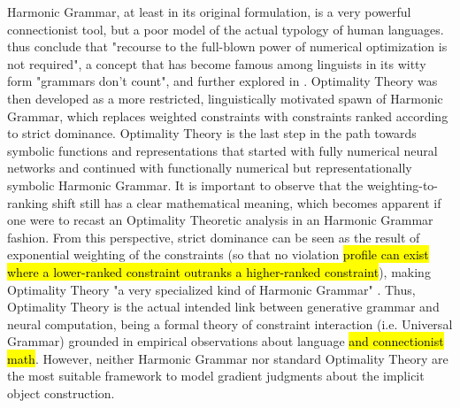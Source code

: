 Harmonic Grammar, at least in its original formulation, is a very powerful connectionist tool, but a poor model of the actual typology of human languages. \textcite[216]{princesmolensky1993optimality} thus conclude that "recourse to the full-blown power of numerical optimization is not required", a concept that has become famous among linguists in its witty form "grammars don't count", and further explored in \textcite{smolensky2006harmony}. Optimality Theory was then developed as a more restricted, linguistically motivated spawn of Harmonic Grammar, which replaces weighted constraints with constraints ranked according to strict dominance. Optimality Theory is the last step in the path towards symbolic functions and representations that started with fully numerical neural networks and continued with functionally numerical but representationally symbolic Harmonic Grammar. It is important to observe that the weighting-to-ranking shift still has a clear mathematical meaning, which becomes apparent if one were to recast an Optimality Theoretic analysis in an Harmonic Grammar fashion. From this perspective, strict dominance can be seen as the result of exponential weighting of the constraints (so that no violation \hl{profile can exist where a lower-ranked constraint outranks a higher-ranked constraint}), making Optimality Theory "a very specialized kind of Harmonic Grammar" \parencite{princesmolensky1993optimality, PrinceSmolensky2008}. Thus, Optimality Theory is the actual intended link between generative grammar and neural computation, being a formal theory of constraint interaction (i.e. Universal Grammar) grounded in empirical observations about language \hl{and connectionist math}. However, neither Harmonic Grammar nor standard Optimality Theory are the most suitable framework to model gradient judgments about the implicit object construction.


